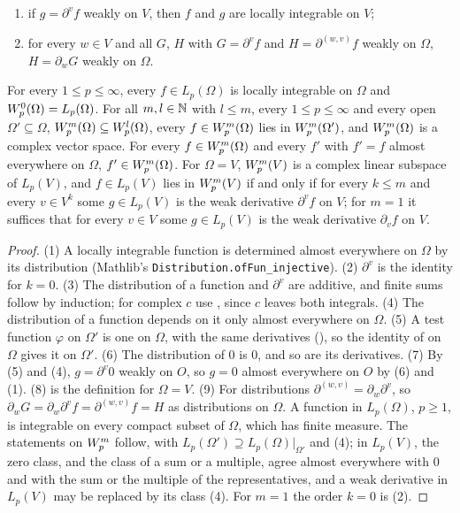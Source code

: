 \begin{lemma}
\begin{enumerate}
    almost everywhere on $O$, then $g = 0$ almost everywhere on $O$;
  \item if $g = \partial^v f$ weakly on $V$, then $f$ and $g$ are locally integrable on $V$;
  \item for every $w \in V$ and all $G$, $H$ with $G = \partial^v f$ and
    $H = \partial^{(w, v)} f$ weakly on $\Omega$, $H = \partial_w G$ weakly on $\Omega$.
\end{enumerate}
For every $1 \leq p \leq \infty$, every $f \in L_p(\Omega)$ is locally integrable on $\Omega$
and $W^{0}_{p}(\Omega) = L_p(\Omega)$. For all $m, l \in \mathbb{N}$ with
$l \leq m$, every $1 \leq p \leq \infty$ and every open $\Omega' \subseteq \Omega$,
$W^{m}_{p}(\Omega) \subseteq W^{l}_{p}(\Omega)$, every $f \in W^{m}_{p}(\Omega)$ lies in
$W^{m}_{p}(\Omega')$, and $W^{m}_{p}(\Omega)$ is a complex vector space. For every
$f \in W^{m}_{p}(\Omega)$ and every $f'$ with $f' = f$ almost everywhere on $\Omega$,
$f' \in W^{m}_{p}(\Omega)$. For $\Omega = V$, $W^{m}_{p}(V)$ is a complex linear subspace of
$L_p(V)$, and $f \in L_p(V)$ lies in $W^{m}_{p}(V)$ if and only if for every $k \leq m$ and
every $v \in V^k$ some $g \in L_p(V)$ is the weak derivative $\partial^v f$ on $V$; for $m = 1$
it suffices that for every $v \in V$ some $g \in L_p(V)$ is the weak derivative $\partial_v f$
on $V$.
\end{lemma}

\begin{proof}
\leanok
(1) A locally integrable function is determined almost everywhere on $\Omega$ by its
distribution (Mathlib's \texttt{Distribution.\allowbreak ofFun\_\allowbreak injective}). (2)
$\partial^v$ is the identity for $k = 0$. (3) The distribution of a function and $\partial^v$ are
additive, and finite sums follow by induction; for complex $c$ use
, since $c$ leaves both integrals. (4) The distribution of a
function depends on it only almost everywhere on $\Omega$.
(5) A test function $\varphi$ on $\Omega'$ is one on $\Omega$, with the same derivatives
(), so the identity of
 on $\Omega$ gives it on $\Omega'$. (6) The distribution of
$0$ is $0$, and so are its derivatives. (7) By (5) and (4), $g = \partial^v 0$ weakly on $O$,
so $g = 0$ almost everywhere on $O$ by (6) and (1). (8) is the definition for $\Omega = V$.
(9) For distributions $\partial^{(w, v)} = \partial_w \partial^v$, so
$\partial_w G = \partial_w \partial^v f = \partial^{(w,v)} f = H$ as distributions on $\Omega$.
A function in $L_p(\Omega)$, $p \geq 1$, is
integrable on every compact subset of $\Omega$, which has finite measure. The statements on
$W^{m}_{p}$ follow, with $L_p(\Omega') \supseteq L_p(\Omega)|_{\Omega'}$ and (4); in $L_p(V)$,
the zero class, and the class of a sum or a multiple, agree almost everywhere with $0$ and with
the sum or the multiple of the representatives, and a weak derivative in $L_p(V)$ may be
replaced by its class (4). For $m = 1$ the order $k = 0$ is (2).
\end{proof}

